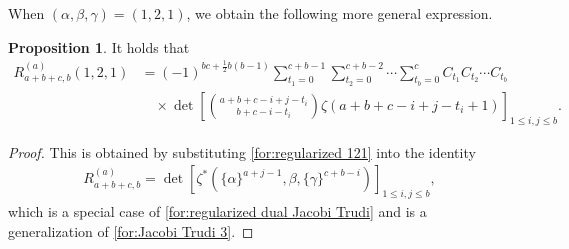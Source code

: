 \documentclass[12pt]{amsart}%
\theoremstyle{definition}
\newtheorem{prop}[theorem]{Proposition}
\newtheorem{example}[theorem]{Example}
\begin{document}
When $(\alpha,\beta,\gamma)=(1,2,1)$, 
we obtain the following more general expression.
\begin{prop}
It holds that 
\begin{align*}
R^{(a)}_{a+b+c,b}(1,2,1)
&=(-1)^{bc+\frac{1}{2}b(b-1)}
\sum^{c+b-1}_{t_1=0}\sum^{c+b-2}_{t_2=0}\cdots \sum^{c}_{t_b=0}C_{t_1}C_{t_2}\cdots C_{t_b}\\
&\quad \times 
\det\left[\binom{a+b+c-i+j-t_i}{b+c-i-t_i}\zeta(a+b+c-i+j-t_i+1)\right]_{1\le i,j\le b}.
\end{align*}
\end{prop}
\begin{proof}
This is obtained by substituting \eqref{for:regularized 121} into the identity  
\begin{align}
\label{for:dual JT for rectangle shape}
 R^{(a)}_{a+b+c,b}
=\det\left[\zeta^{\ast}(\{\alpha\}^{a+j-1},\beta,\{\gamma\}^{c+b-i})\right]_{1\le i,j\le b},
\end{align}
which is a special case of 
\eqref{for:regularized dual Jacobi Trudi} 
and is a generalization of \eqref{for:Jacobi Trudi 3}.
\end{proof}
\end{document}
